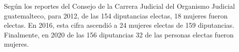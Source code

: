 Según los reportes del Consejo de la Carrera Judicial del Organismo Judicial guatemalteco, para 2012, de las 154 diputancias electas, 18 mujeres fueron electas. En 2016, esta cifra ascendió a 24 mujeres electas de 159 diputancias. Finalmente, en 2020 de las 156 diputancias 32 de las personas electas fueron mujeres. 